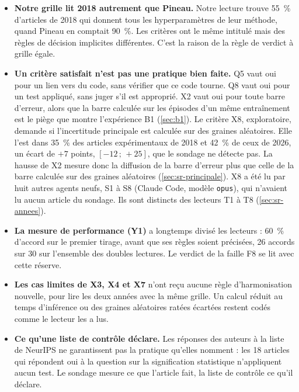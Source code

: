 \begin{itemize}
  \item \textbf{Notre grille lit 2018 autrement que Pineau.} Notre lecture trouve 55~\% d'articles
        de 2018 qui donnent tous les hyperparamètres de leur méthode, quand Pineau en comptait
        90~\%. Les critères ont le même intitulé mais des règles de décision implicites différentes.
        C'est la raison de la règle de verdict à grille égale.
  \item \textbf{Un critère satisfait n'est pas une pratique bien faite.} Q5 vaut oui pour un lien
        vers du code, sans vérifier que ce code tourne. Q8 vaut oui pour un test appliqué, sans juger
        s'il est approprié. X2 vaut oui pour toute barre d'erreur, alors que la barre calculée sur les
        épisodes d'un même entraînement est le piège que montre l'expérience B1
        (\cref{sec:b1}). Le critère X8, exploratoire, demande si
        l'incertitude principale est calculée sur des graines aléatoires. Elle l'est dans 35~\% des
        articles expérimentaux de 2018 et 42~\% de ceux de 2026, un écart de $+7$ points,
        $[-12\,;\,+25]$, que le sondage ne détecte pas. La hausse de X2 mesure donc la diffusion de la
        barre d'erreur plus que celle de la barre calculée sur des graines aléatoires
        (\cref{sec:sr-principale}). X8 a été lu par huit autres agents neufs,
        S1 à S8 (Claude Code, modèle \texttt{opus}), qui n'avaient lu aucun article du sondage. Ils
        sont distincts des lecteurs T1 à T8 (\cref{sec:sr-annees}).
  \item \textbf{La mesure de performance (Y1)} a longtemps divisé les lecteurs : 60~\% d'accord sur
        le premier tirage, avant que ses règles soient précisées, 26 accords sur 30 sur l'ensemble des
        doubles lectures. Le verdict de la faille F8 se lit avec cette réserve.
  \item \textbf{Les cas limites de X3, X4 et X7} n'ont reçu aucune règle d'harmonisation nouvelle,
        pour lire les deux années avec la même grille. Un calcul réduit au temps d'inférence ou des
        graines aléatoires ratées écartées restent codés comme le lecteur les a lus.
  \item \textbf{Ce qu'une liste de contrôle déclare.} Les réponses des auteurs à la liste de NeurIPS
        ne garantissent pas la pratique qu'elles nomment : les 18 articles qui répondent oui à la
        question sur la signification statistique n'appliquent aucun test. Le sondage mesure ce que
        l'article fait, la liste de contrôle ce qu'il déclare.

\end{itemize}
